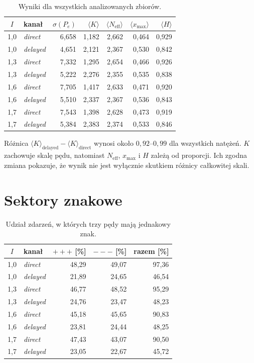 \documentclass[12pt,letterpaper,oneside]{report}
\numberwithin{equation}{chapter}
\numberwithin{figure}{chapter}
\numberwithin{table}{chapter}
\newcommand{\direct}{\textit{direct}}
\newcommand{\delayed}{\textit{delayed}}
\begin{document}
\begin{table}[htbp]
\centering
\caption{Wyniki dla wszystkich analizowanych zbiorów.}
\label{tab:summary-all}
\small
\begin{tabular}{clrrrrr}
\toprule
$I$ & kanał & $\sigma(P_e)$ & $\langle K\rangle$ &
$\langle N_{\mathrm{eff}}\rangle$ & $\langle x_{\max}\rangle$ & $\langle H\rangle$\\
\midrule
1,0 & \direct  & 6,658 & 1,182 & 2,662 & 0,464 & 0,929\\
1,0 & \delayed & 4,651 & 2,121 & 2,367 & 0,530 & 0,842\\
1,3 & \direct  & 7,332 & 1,295 & 2,654 & 0,466 & 0,926\\
1,3 & \delayed & 5,222 & 2,276 & 2,355 & 0,535 & 0,838\\
1,6 & \direct  & 7,705 & 1,417 & 2,633 & 0,471 & 0,920\\
1,6 & \delayed & 5,510 & 2,337 & 2,367 & 0,536 & 0,843\\
1,7 & \direct  & 7,543 & 1,398 & 2,628 & 0,473 & 0,919\\
1,7 & \delayed & 5,384 & 2,383 & 2,374 & 0,533 & 0,846\\
\bottomrule
\end{tabular}
\end{table}

Różnica $\langle K\rangle_{\mathrm{delayed}}-\langle K\rangle_{\mathrm{direct}}$ wynosi około $0{,}92$--$0{,}99$ dla wszystkich natężeń. $K$ zachowuje skalę pędu, natomiast $N_{\mathrm{eff}}$, $x_{\max}$ i $H$ zależą od proporcji. Ich zgodna zmiana pokazuje, że wynik nie jest wyłącznie skutkiem różnicy całkowitej skali.

\section{Sektory znakowe}

\begin{table}[htbp]
\centering
\caption{Udział zdarzeń, w których trzy pędy mają jednakowy znak.}
\label{tab:sign-all}
\begin{tabular}{clrrr}
\toprule
$I$ & kanał & $+++$ [\%] & $---$ [\%] & razem [\%]\\
\midrule
1,0 & \direct  & 48,29 & 49,07 & 97,36\\
1,0 & \delayed & 21,89 & 24,65 & 46,54\\
1,3 & \direct  & 46,77 & 48,52 & 95,29\\
1,3 & \delayed & 24,76 & 23,47 & 48,23\\
1,6 & \direct  & 45,18 & 45,65 & 90,83\\
1,6 & \delayed & 23,81 & 24,44 & 48,25\\
1,7 & \direct  & 47,43 & 43,07 & 90,50\\
1,7 & \delayed & 23,05 & 22,67 & 45,72\\
\bottomrule
\end{tabular}
\end{table}
\end{document}
